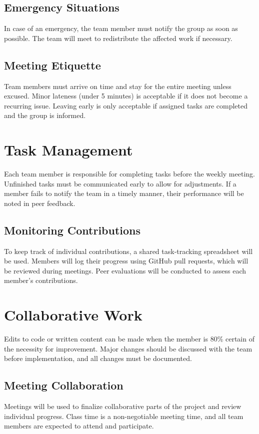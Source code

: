 \documentclass[12pt]{article}
\begin{document}
\subsection{Emergency Situations}
In case of an emergency, the team member must notify the group as soon as possible. The team will meet to redistribute the affected work if necessary.

\subsection{Meeting Etiquette}
Team members must arrive on time and stay for the entire meeting unless excused. Minor lateness (under 5 minutes) is acceptable if it does not become a recurring issue. Leaving early is only acceptable if assigned tasks are completed and the group is informed.

\section{Task Management}
Each team member is responsible for completing tasks before the weekly meeting. Unfinished tasks must be communicated early to allow for adjustments. If a member fails to notify the team in a timely manner, their performance will be noted in peer feedback.

\subsection{Monitoring Contributions}
To keep track of individual contributions, a shared task-tracking spreadsheet will be used. Members will log their progress using GitHub pull requests, which will be reviewed during meetings. Peer evaluations will be conducted to assess each member’s contributions.

\section{Collaborative Work}
Edits to code or written content can be made when the member is 80\% certain of the necessity for improvement. Major changes should be discussed with the team before implementation, and all changes must be documented.

\subsection{Meeting Collaboration}
Meetings will be used to finalize collaborative parts of the project and review individual progress. Class time is a non-negotiable meeting time, and all team members are expected to attend and participate.
\end{document}
